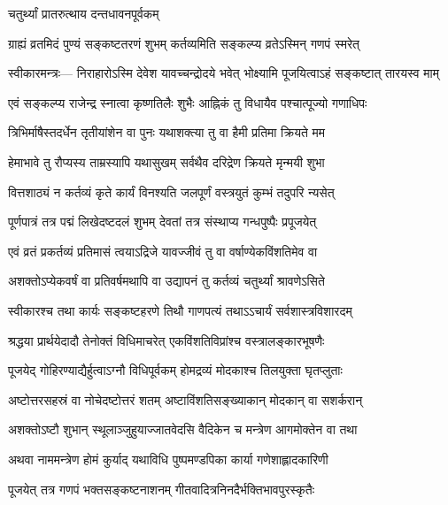 
\onelineshloka
{चतुर्थ्यां प्रातरुत्थाय दन्तधावनपूर्वकम्} %


\twolineshloka
{ग्राह्यं व्रतमिदं पुण्यं सङ्कष्टतरणं शुभम्}
{कर्तव्यमिति सङ्कल्प्य व्रतेऽस्मिन् गणपं स्मरेत्} %


स्वीकारमन्त्रः—\hfill 
\twolineshloka
{निराहारोऽस्मि देवेश यावच्चन्द्रोदये भवेत्}
{भोक्ष्यामि पूजयित्वाऽहं सङ्कष्टात् तारयस्व माम्} %


\twolineshloka
{एवं सङ्कल्प्य राजेन्द्र स्नात्वा कृष्णतिलैः शुभैः}
{आह्निकं तु विधायैव पश्चात्पूज्यो गणाधिपः} %


\twolineshloka
{त्रिभिर्माषैस्तदर्धेन तृतीयांशेन वा पुनः}
{यथाशक्त्या तु वा हैमी प्रतिमा क्रियते मम} %


\twolineshloka
{हेमाभावे तु रौप्यस्य ताम्रस्यापि यथासुखम्}
{सर्वथैव दरिद्रेण क्रियते मृन्मयी शुभा} %


\twolineshloka
{वित्तशाठ्यं न कर्तव्यं कृते कार्यं विनश्यति}
{जलपूर्णं वस्त्रयुतं कुम्भं तदुपरि न्यसेत्} %


\twolineshloka
{पूर्णपात्रं तत्र पद्मं लिखेदष्टदलं शुभम्}
{देवतां तत्र संस्थाप्य गन्धपुष्पैः प्रपूजयेत्} %


\twolineshloka
{एवं व्रतं प्रकर्तव्यं प्रतिमासं त्वयाऽद्रिजे}
{यावज्जीवं तु वा वर्षाण्येकविंशतिमेव वा} %


\twolineshloka
{अशक्तोऽप्येकवर्षं वा प्रतिवर्षमथापि वा}
{उद्यापनं तु कर्तव्यं चतुर्थ्यां श्रावणेऽसिते} %


\twolineshloka
{स्वीकारश्च तथा कार्यः सङ्कष्टहरणे तिथौ}
{गाणपत्यं तथाऽऽचार्यं सर्वशास्त्रविशारदम्} %


\twolineshloka
{श्रद्धया प्रार्थयेदादौ तेनोक्तं विधिमाचरेत्}
{एकविंशतिविप्रांश्च वस्त्रालङ्कारभूषणैः} %


\twolineshloka
{पूजयेद् गोहिरण्याद्यैर्हुत्वाऽग्नौ विधिपूर्वकम्}
{होमद्रव्यं मोदकाश्च तिलयुक्ता घृतप्लुताः} %


\twolineshloka
{अष्टोत्तरसहस्रं वा नोचेदष्टोत्तरं शतम्}
{अष्टाविंशतिसङ्ख्याकान् मोदकान् वा सशर्करान्} %


\twolineshloka
{अशक्तोऽष्टौ शुभान् स्थूलाञ्जुहुयाज्जातवेदसि}
{वैदिकेन च मन्त्रेण आगमोक्तेन वा तथा} %


\twolineshloka
{अथवा नाममन्त्रेण होमं कुर्याद् यथाविधि}
{पुष्पमण्डपिका कार्या गणेशाह्लादकारिणी} %


\twolineshloka
{पूजयेत् तत्र गणपं भक्तसङ्कष्टनाशनम्}
{गीतवादित्रनिनदैर्भक्तिभावपुरस्कृतैः} %


